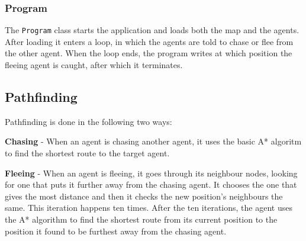 \subsubsection{Program}
\label{03_01_05}
The \texttt{Program} class starts the application and loads both the map and the agents. After loading it enters a loop, in which the agents are told to chase or flee from the other agent. When the loop ends, the program writes at which position the fleeing agent is caught, after which it terminates.

\subsection{Pathfinding}
\label{03_02}

Pathfinding is done in the following two ways:

\begin{my_itemize}

	\item \textbf{Chasing} - When an agent is chasing another agent, it uses the basic A* algoritm to find the shortest route to the target agent.

	\item \textbf{Fleeing} - When an agent is fleeing, it goes through its neighbour nodes, looking for one that puts it further away from the chasing agent. It chooses the one that gives the most distance and then it checks the new position's neighbours the same. This iteration happens ten times. After the ten iterations, the agent uses the A* algorithm to find the shortest route from its current position to the position it found to be furthest away from the chasing agent.

\end{my_itemize}